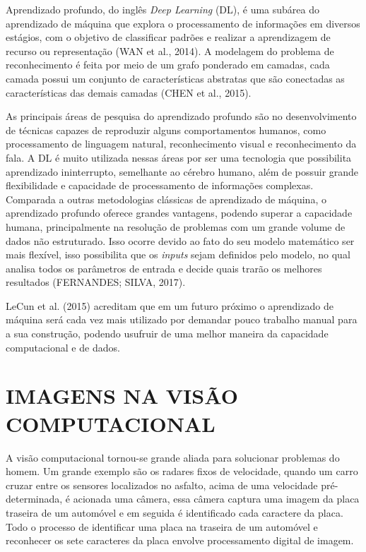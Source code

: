 Aprendizado profundo, do inglês \textit{Deep Learning} (DL), é uma subárea do aprendizado de máquina que explora o processamento de informações em diversos estágios, com o objetivo de classificar padrões e realizar a aprendizagem de recurso ou representação (WAN et al., 2014). A modelagem do problema de reconhecimento é feita por meio de um grafo ponderado em camadas, cada camada possui um conjunto de características abstratas que são conectadas as características das demais camadas (CHEN et al., 2015).

As principais áreas de pesquisa do aprendizado profundo são no desenvolvimento de técnicas capazes de reproduzir alguns comportamentos humanos, como processamento de linguagem natural, reconhecimento visual e reconhecimento da fala. A DL é muito utilizada nessas áreas por ser uma tecnologia que possibilita aprendizado ininterrupto, semelhante ao cérebro humano, além de possuir grande flexibilidade e capacidade de processamento de informações complexas. Comparada a outras metodologias clássicas de aprendizado de máquina, o aprendizado profundo oferece grandes vantagens, podendo superar a capacidade humana, principalmente na resolução de problemas com um grande volume de dados não estruturado. Isso ocorre devido ao fato do seu modelo matemático ser mais flexível, isso possibilita que os \textit{inputs} sejam definidos pelo modelo, no qual analisa todos os parâmetros de entrada e decide quais trarão os melhores resultados (FERNANDES; SILVA, 2017).

LeCun et al. (2015) acreditam que em um futuro próximo o aprendizado de máquina será cada vez mais utilizado por demandar pouco trabalho manual para a sua construção, podendo usufruir de uma melhor maneira da capacidade computacional e de dados.

\section{IMAGENS NA VISÃO COMPUTACIONAL}
\label{sec:titSecVisaoComputacional}

A visão computacional tornou-se grande aliada para solucionar problemas do homem. Um grande exemplo são os radares fixos de velocidade, quando um carro cruzar entre os sensores localizados no asfalto, acima de uma velocidade pré-determinada, é acionada uma câmera, essa câmera captura uma imagem da placa traseira de um automóvel e em seguida é identificado cada caractere da placa. Todo o processo de identificar uma placa na traseira de um automóvel e reconhecer os sete caracteres da placa envolve processamento digital de imagem.

